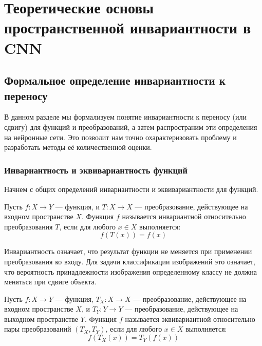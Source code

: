 \chapter{Теоретические основы пространственной инвариантности в CNN} \label{theory}

\section{Формальное определение инвариантности к переносу}
\label{theory:formal_definition}

В данном разделе мы формализуем понятие инвариантности к переносу (или сдвигу) для функций и преобразований, а затем распространим эти определения на нейронные сети. Это позволит нам точно охарактеризовать проблему и разработать методы её количественной оценки.

\subsection{Инвариантность и эквивариантность функций}
\label{theory:formal_definition:invariance}

Начнем с общих определений инвариантности и эквивариантности для функций.

\begin{definition}
Пусть $f: X \rightarrow Y$ — функция, и $T: X \rightarrow X$ — преобразование, действующее на входном пространстве $X$. Функция $f$ называется инвариантной относительно преобразования $T$, если для любого $x \in X$ выполняется:
\begin{equation}
f(T(x)) = f(x)
\end{equation}
\end{definition}

Инвариантность означает, что результат функции не меняется при применении преобразования ко входу. Для задачи классификации изображений это означает, что вероятность принадлежности изображения определенному классу не должна меняться при сдвиге объекта.

\begin{definition}
Пусть $f: X \rightarrow Y$ — функция, $T_X: X \rightarrow X$ — преобразование, действующее на входном пространстве $X$, и $T_Y: Y \rightarrow Y$ — преобразование, действующее на выходном пространстве $Y$. Функция $f$ называется эквивариантной относительно пары преобразований $(T_X, T_Y)$, если для любого $x \in X$ выполняется:
\begin{equation}
f(T_X(x)) = T_Y(f(x))
\end{equation}
\end{definition}


